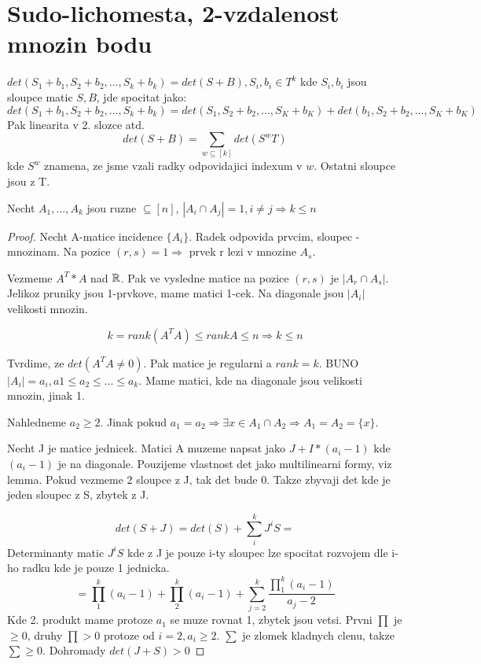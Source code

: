 \section{\texorpdfstring{Sudo-lichomesta, 2-vzdalenost mnozin bodu}{Sudo-lichomesta, 2-vzdalenost mnozin bodu}}
\vspace{5mm}
\large


\begin{lemma}
	$det(S_1 + b_1, S_2 + b_2 , ... , S_k + b_k) = det(S + B), S_i, b_i \in T^k$ kde $S_i,b_i$ jsou sloupce matic $S, B$, jde spocitat jako:
	\[ det(S_1 + b_1, S_2 + b_2 , ... , S_k + b_k) = det(S_1, S_2 + b_2 , ... , S_K + b_K) + det(b_1, S_2 + b_2 , ... , S_K + b_K) \]
	Pak linearita v 2. slozce atd.
	\[ det(S + B) = \sum_{w \subseteq [k]} det(S^wT) \]
	kde $S^w$ znamena, ze jsme vzali radky odpovidajici indexum v $w$. Ostatni sloupce jsou z T.
\end{lemma}


\begin{theorem}
	Necht $A_1, ... , A_k$ jsou ruzne $ \subseteq [n]$, $ |A_i \cap A_j| = 1, i \ne j \Rightarrow k \leq n$
\end{theorem}
\begin{proof}
	Necht A-matice incidence $\{A_i\}$. Radek odpovida prvcim, sloupec - mnozinam. Na pozice $(r,s) = 1 \Rightarrow$ prvek r lezi v mnozine $A_s$.

	Vezmeme $A^T * A$ nad $\operatorname{\mathbb{R}}$. Pak ve vysledne matice na pozice $(r,s)$ je $|A_r \cap A_s|$. Jelikoz pruniky jsou 1-prvkove, mame matici 1-cek. Na diagonale jsou $|A_i|$ velikosti mnozin.

	\[ k = rank(A^TA) \leq rank A \leq n \Rightarrow k \leq n \]

	Tvrdime, ze $det(A^TA \ne 0)$. Pak matice je regularni a $rank = k$.
	BUNO $|A_i| = a_i, a1 \leq a_2 \leq ... \leq a_k$. Mame matici, kde na diagonale jsou velikosti mnozin, jinak 1.

	Nahledneme $a_2 \geq 2$. Jinak pokud $a_1 = a_2 \Rightarrow \exists x \in A_1 \cap A_2 \Rightarrow A_1 = A_2 = \{ x \} $.

	Necht J je matice jednicek. Matici A muzeme napsat jako $J + I*(a_i - 1)$ kde $(a_i - 1)$ je na diagonale.
	Pouzijeme vlastnost det jako multilinearni formy, viz lemma. Pokud vezmeme 2 sloupce z J, tak det bude 0. Takze zbyvaji det kde je jeden sloupec z S, zbytek z J.

	\[ det(S + J) = det(S) + \sum_i^k J^iS = \]
	Determinanty matic $J^iS$ kde z J je pouze i-ty sloupec lze spocitat rozvojem dle i-ho radku kde je pouze 1 jednicka.
	\[ = \prod_1^k (a_i - 1) + \prod_2^k (a_i - 1) + \sum_{j=2}^k \frac{\prod_1^k (a_i - 1)}{a_j - 2} \]
	Kde 2. produkt mame protoze $a_1$ se muze rovnat 1, zbytek jsou vetsi. Prvni $\prod$ je $\geq 0$, druhy $\prod > 0$ protoze od $i = 2, a_i \geq 2$. $\sum$ je zlomek kladnych clenu, takze $\sum \geq 0$. Dohromady $ det(J + S) > 0$

\end{proof}

